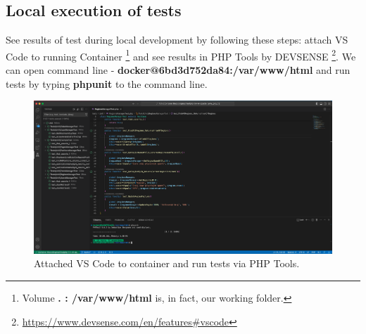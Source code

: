 \subsection{Local execution of tests}
See results of test during local development by following these steps: attach VS Code to running Container \footnote{Volume \textbf{. : /var/www/html} is, in fact, our working folder.} and see results in PHP Tools by DEVSENSE \footnote{\url{https://www.devsense.com/en/features\#vscode}}. We can open command line - \textbf{docker@6bd3d752da84:/var/www/html} and run tests by typing \textbf{phpunit} to the command line. 
\begin{figure}[h]	
    \centering	
    \includegraphics[scale=0.207]{img/phpunit_locally.png}
    \caption{Attached VS Code to container and run tests via PHP Tools.}
    \label{fig4.3:phpunitlocally}
\end{figure}
\newpage
